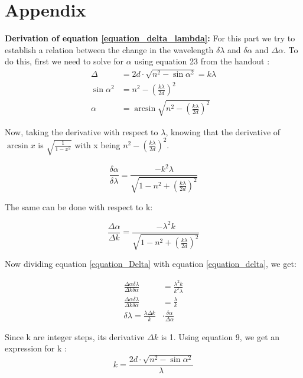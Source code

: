 \documentclass{scrartcl}
\begin{document}
\section{Appendix}
\textbf{Derivation of equation \ref{equation_delta_lambda}:}
For this part we try to establish a relation between the change in the wavelength $\delta \lambda$ and $\delta \alpha$ and $\Delta \alpha$. To do this, first we need to solve for $\alpha$ using equation 23 from the handout \cite{Handout}:
\begin{align}
    \Delta &= 2d\cdot \sqrt{n^2 -\sin{\alpha}^2} = k\lambda \\
    \sin{\alpha}^2 &= n^2-\left(\frac{k\lambda}{2d}\right)^2\\
    \alpha &= \arcsin{\sqrt{n^2-\left(\frac{k\lambda}{2d}\right)^2}}
\end{align}

Now, taking the derivative with respect to $\lambda$, knowing that the derivative of $\arcsin{x}$ is $\sqrt{\frac{1}{1-x^2}}$ with x being $n^2-\left(\frac{k\lambda}{2d}\right)^2$.

\begin{equation}
    \frac{\delta \alpha}{\delta \lambda} = {\frac{-k^2\lambda}{\sqrt{1-n^2+\left(\frac{k\lambda}{2d}\right)^2}}}
    \label{equation_delta}
\end{equation}

The same can be done with respect to k:

\begin{equation}
    \frac{\Delta \alpha}{\Delta k} = {\frac{-\lambda^2k}{\sqrt{1-n^2+\left(\frac{k\lambda}{2d}\right)^2}}}
    \label{equation_Delta}
\end{equation}

Now dividing equation \ref{equation_Delta} with equation \ref{equation_delta}, we get:

\begin{align}
    \frac{\Delta\alpha \delta \lambda}{\Delta k \delta \alpha} &= \frac{\lambda^2k}{k^2\lambda} \\
    \frac{\Delta\alpha \delta \lambda}{\Delta k \delta \alpha} &= \frac{\lambda}{k}\\
    \delta \lambda = \frac{\lambda \Delta k}{k} &\cdot \frac{\delta \alpha}{\Delta \alpha}
\end{align}

Since k are integer steps, its derivative $\Delta k$ is 1.
Using equation 9, we get an expression for k :
\begin{equation}
    k = \frac{2d\cdot \sqrt{n^2 -\sin{\alpha}^2}}{\lambda}
\end{equation}
\end{document}

